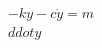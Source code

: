 \documentclass[preview]{standalone}
\begin{document}
\begin{align*}
-ky -c\dot{y} = m\\ddot{y}
\end{align*}
\end{document}
